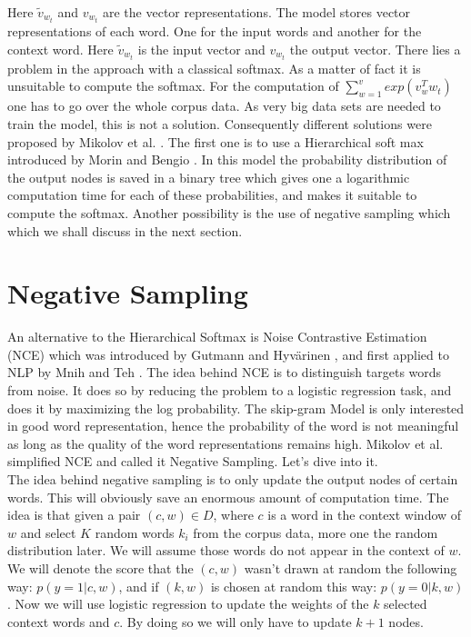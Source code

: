 {  Here $\tilde{v}_{w_t}$ and $ v_{w_t}$ are the vector representations. The model stores vector representations of each word. One for the input words and another for the context word. Here $\tilde{v}_{w_t}$ is the input vector and  $ v_{w_t}$ the output vector. There lies a problem in the approach with a classical softmax. As a matter of fact it is unsuitable to compute the softmax. For the computation of $\sum_{w=1}^v exp(v_w^T w_t)$ one has to go over the whole corpus data. As very big data sets are needed to train the model, this is not a solution. Consequently different solutions were proposed by Mikolov et al. \cite{mikolov2}. The first one is to use a Hierarchical soft max introduced by Morin and Bengio \cite{hsoftmax}. In this model the probability distribution of the output nodes is saved in a binary tree which gives one a logarithmic computation time for each of these probabilities, and makes it suitable to compute the softmax. Another possibility is the use of negative sampling which which we shall discuss in the next section. 

\section{Negative Sampling}
An alternative to the Hierarchical Softmax is Noise Contrastive Estimation (NCE) which was introduced by Gutmann and Hyv{\"a}rinen \cite{nce-original},  and first applied to NLP by Mnih and Teh \cite{mnih}. The idea behind NCE is to distinguish targets words from noise. It does so by reducing the problem to a logistic regression task, and does it by maximizing the log probability. The skip-gram Model is only interested in good word representation, hence the probability of the word is not meaningful as long as the quality of the word representations remains high. Mikolov et al. \cite{mikolov2} simplified NCE and called it Negative Sampling. Let's dive into it.\\
The idea behind negative sampling is to only update the output nodes of certain words. This will obviously save an enormous amount of computation time. The idea is that given a pair $(c,w) \in D$, where $c$ is a word in the context window of $w$ and  select $K$ random words $k_i$ from the corpus data, more one the random distribution later. We will assume those words do not appear in the context of $w$. We will denote the score that the $(c,w)$ wasn't drawn at random the following way: $p(y=1|c,w)$, and if $(k,w) $ is chosen at random this way: $p(y=0|k,w)$.  Now we will use logistic regression to update the weights of the $k$ selected context words and $c$. By doing so we will only have to update $k+1$ nodes.

}
